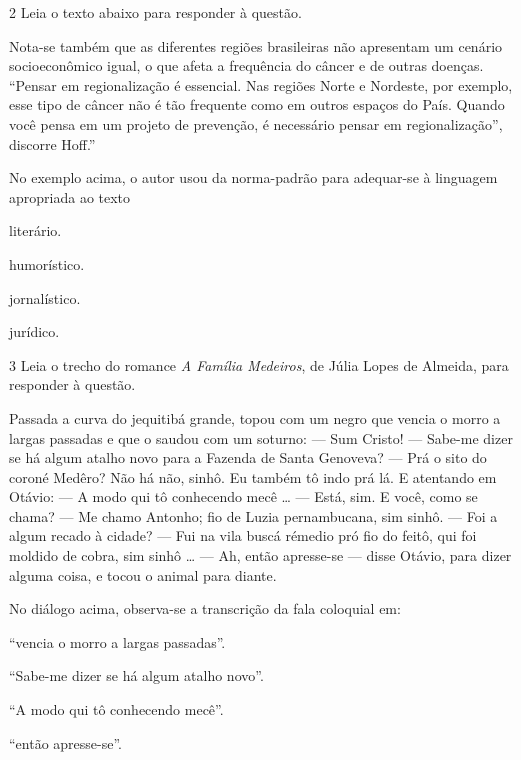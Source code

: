 \num{2} Leia o texto abaixo para responder à questão.

\begin{myquote}
Nota-se também que as diferentes regiões brasileiras não apresentam um
cenário socioeconômico igual, o que afeta a frequência do câncer e de
outras doenças. ``Pensar em regionalização é essencial. Nas regiões Norte
e Nordeste, por exemplo, esse tipo de câncer não é tão frequente como em
outros espaços do País. Quando você pensa em um projeto de prevenção, é
necessário pensar em regionalização'', discorre Hoff.''

\end{myquote}

No exemplo acima, o autor usou da norma-padrão para adequar-se à linguagem apropriada ao texto

\begin{escolha}
  
  \item literário.
  
  \item humorístico.
  
  \item jornalístico.
  
  \item jurídico.

\end{escolha}

\num{3} Leia o trecho do romance \textit{A Família Medeiros}, de Júlia Lopes de Almeida, para 
responder à questão. 

\begin{myquote}

Passada a curva do jequitibá grande, topou com um negro
que vencia o morro a largas passadas e que o saudou com um
soturno:
--- Sum Cristo!
--- Sabe-me dizer se há algum atalho novo para a Fazenda de
Santa Genoveva?
--- Prá o sito do coroné Medêro? Não há não, sinhô. Eu
também tô indo prá lá.
E atentando em Otávio:
--- A modo qui tô conhecendo mecê \ldots{}
--- Está, sim. E você, como se chama?
--- Me chamo Antonho; fio de Luzia pernambucana, sim sinhô.
--- Foi a algum recado à cidade?
--- Fui na vila buscá rémedio pró fio do feitô, qui foi moldido
de cobra, sim sinhô \ldots{}
--- Ah, então apresse-se --- disse Otávio, para dizer alguma
coisa, e tocou o animal para diante.


\end{myquote}

No diálogo acima, observa-se a transcrição da fala coloquial em:

\begin{escolha}
  
  \item ``vencia o morro a largas passadas''.
  
  \item ``Sabe-me dizer se há algum atalho novo''. 
  
  \item ``A modo qui tô conhecendo mecê''.
  
  \item ``então apresse-se''. 

\end{escolha}
